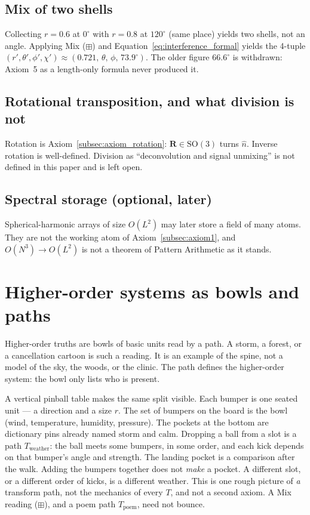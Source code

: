 \documentclass[12pt, a4paper]{article}
\begin{document}
\subsection{Mix of two shells}
Collecting $r=0.6$ at $0^\circ$ with $r=0.8$ at $120^\circ$ (same
place) yields two shells, not an angle. Applying Mix ($\boxplus$) and
Equation~\eqref{eq:interference_formal} yields the 4-tuple
$(r',\theta',\phi',\chi')\approx(0.721,\,\theta,\,\phi,\,73.9^\circ)$.
The older figure $66.6^\circ$ is withdrawn: Axiom~5 as a length-only
formula never produced it.

\subsection{Rotational transposition, and what division is not}
\label{subsec:division_open}
Rotation is Axiom~\ref{subsec:axiom_rotation}: $\mathbf{R}\in\mathrm{SO}(3)$
turns $\hat n$. Inverse rotation is well-defined. Division as
``deconvolution and signal unmixing'' is not defined in this paper and
is left open.

\subsection{Spectral storage (optional, later)}
Spherical-harmonic arrays of size $O(L^2)$ may later store a field of
many atoms. They are not the working atom of
Axiom~\ref{subsec:axiom1}, and $O(N^3)\to O(L^2)$ is not a theorem of
Pattern Arithmetic as it stands.

\section{Higher-order systems as bowls and paths}
\label{sec:higher_order}
Higher-order truths are bowls of basic units read by a path.
A storm, a forest, or a cancellation cartoon is such a reading.
It is an example of the spine, not a model of the sky, the woods,
or the clinic. The path defines the higher-order system: the bowl
only lists who is present.

A vertical pinball table makes the same split visible. Each bumper
is one seated unit --- a direction and a size \(r\). The set of
bumpers on the board is the bowl (wind, temperature, humidity,
pressure). The pockets at the bottom are dictionary pins already
named \(\mathrm{storm}\) and \(\mathrm{calm}\). Dropping a ball from
a slot is a path \(T_{\mathrm{weather}}\): the ball meets some
bumpers, in some order, and each kick depends on that bumper's
angle and strength. The landing pocket is a comparison after the
walk. Adding the bumpers together does not \emph{make} a pocket.
A different slot, or a different order of kicks, is a different
weather. This is one rough picture of \emph{a} transform path, not
the mechanics of every $T$, and not a second axiom. A Mix reading ($\boxplus$), and a poem path $T_{\mathrm{poem}}$, need not bounce.
\end{document}
